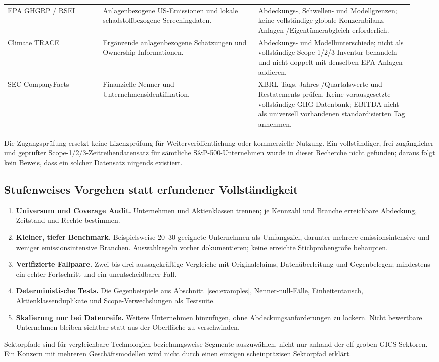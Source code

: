 \documentclass[11pt,a4paper]{article}
\begin{document}
\begin{longtable}{@{}P{0.22\linewidth}P{0.36\linewidth}P{0.36\linewidth}@{}}
EPA GHGRP / RSEI \cite{epaghg,rsei} & Anlagenbezogene US-Emissionen und lokale schadstoffbezogene Screeningdaten. & Abdeckungs-, Schwellen- und Modellgrenzen; keine vollständige globale Konzernbilanz. Anlagen-/Eigentümerabgleich erforderlich. \\
Climate TRACE \cite{climatetrace} & Ergänzende anlagenbezogene Schätzungen und Ownership-Informationen. & Abdeckungs- und Modellunterschiede; nicht als vollständige Scope-1/2/3-Inventur behandeln und nicht doppelt mit denselben EPA-Anlagen addieren. \\
SEC CompanyFacts \cite{sec} & Finanzielle Nenner und Unternehmensidentifikation. & XBRL-Tags, Jahres-/Quartalswerte und Restatements prüfen. Keine vorausgesetzte vollständige GHG-Datenbank; EBITDA nicht als universell vorhandenen standardisierten Tag annehmen. \\
\bottomrule
\end{longtable}
\normalsize
Die Zugangsprüfung ersetzt keine Lizenzprüfung für Weiterveröffentlichung oder kommerzielle Nutzung. Ein vollständiger, frei zugänglicher und geprüfter Scope-1/2/3-Zeitreihendatensatz für sämtliche S\&P-500-Unternehmen wurde in dieser Recherche nicht gefunden; daraus folgt kein Beweis, dass ein solcher Datensatz nirgends existiert.

\subsection{Stufenweises Vorgehen statt erfundener Vollständigkeit}
\begin{enumerate}
\item \textbf{Universum und Coverage Audit.} Unternehmen und Aktienklassen trennen; je Kennzahl und Branche erreichbare Abdeckung, Zeitstand und Rechte bestimmen.
\item \textbf{Kleiner, tiefer Benchmark.} Beispielsweise 20--30 geeignete Unternehmen als Umfangsziel, darunter mehrere emissionsintensive und weniger emissionsintensive Branchen. Auswahlregeln vorher dokumentieren; keine erreichte Stichprobengröße behaupten.
\item \textbf{Verifizierte Fallpaare.} Zwei bis drei aussagekräftige Vergleiche mit Originalclaims, Datenüberleitung und Gegenbelegen; mindestens ein echter Fortschritt und ein unentscheidbarer Fall.
\item \textbf{Deterministische Tests.} Die Gegenbeispiele aus Abschnitt~\ref{sec:examples}, Nenner-null-Fälle, Einheitentausch, Aktienklassenduplikate und Scope-Verwechslungen als Testsuite.
\item \textbf{Skalierung nur bei Datenreife.} Weitere Unternehmen hinzufügen, ohne Abdeckungsanforderungen zu lockern. Nicht bewertbare Unternehmen bleiben sichtbar statt aus der Oberfläche zu verschwinden.
\end{enumerate}
Sektorpfade sind für vergleichbare Technologien beziehungsweise Segmente auszuwählen, nicht nur anhand der elf groben GICS-Sektoren. Ein Konzern mit mehreren Geschäftsmodellen wird nicht durch einen einzigen scheinpräzisen Sektorpfad erklärt.
\end{document}
